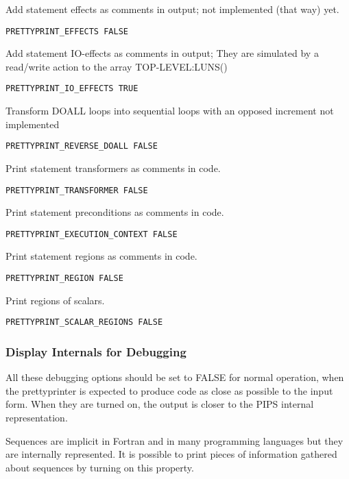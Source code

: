 Add statement effects as comments in output; not implemented (that way) yet.

\begin{verbatim}
PRETTYPRINT_EFFECTS FALSE
\end{verbatim}

Add statement IO-effects as comments in output; They are simulated by
a read/write action to the array TOP-LEVEL:LUNS()

\begin{verbatim}
PRETTYPRINT_IO_EFFECTS TRUE
\end{verbatim}

Transform DOALL loops into sequential loops with an opposed increment
not implemented

\begin{verbatim}
PRETTYPRINT_REVERSE_DOALL FALSE
\end{verbatim}

Print statement transformers as comments in code.

\begin{verbatim}
PRETTYPRINT_TRANSFORMER FALSE
\end{verbatim}

Print statement preconditions as comments in code.

\begin{verbatim}
PRETTYPRINT_EXECUTION_CONTEXT FALSE
\end{verbatim}

Print statement regions as comments in code.

\begin{verbatim}
PRETTYPRINT_REGION FALSE
\end{verbatim}

Print regions of scalars.

\begin{verbatim}
PRETTYPRINT_SCALAR_REGIONS FALSE
\end{verbatim}

\subsubsection{Display Internals for Debugging}

All these debugging options should be set to FALSE for normal operation,
when the prettyprinter is expected to produce code as close as possible to
the input form.
When they are turned on, the output is closer to the PIPS internal
representation.

Sequences are implicit in Fortran and in many programming languages but
they are internally represented. It is possible to print pieces of
information  gathered about sequences by turning on this property.

